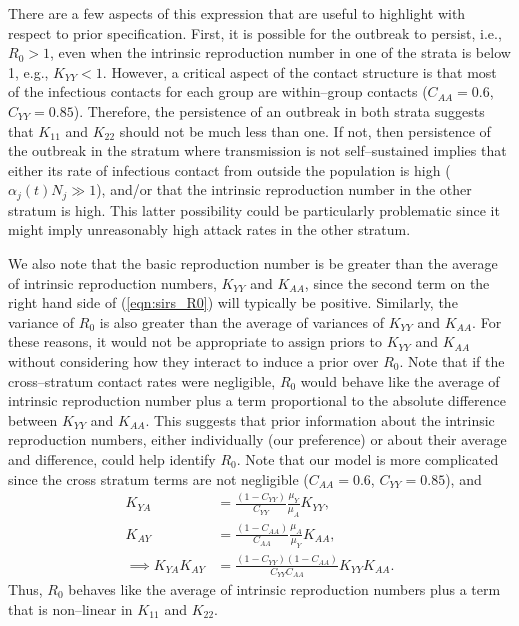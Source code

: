 There are a few aspects of this expression that are useful to highlight with respect to prior specification. First, it is possible for the outbreak to persist, i.e., $ R_0 > 1 $, even when the intrinsic reproduction number in one of the strata is below 1, e.g., $ K_{YY} <1$. However, a critical aspect of the contact structure is that most of the infectious contacts for each group are within--group contacts ($ C_{AA} = 0.6 $, $ C_{YY}=0.85 $). Therefore, the persistence of an outbreak in both strata suggests that $ K_{11} $ and $ K_{22} $ should not be much less than one. If not, then persistence of the outbreak in the stratum where transmission is not self--sustained implies that either its rate of infectious contact from outside the population is high ($ \alpha_j(t)N_j \gg  1$), and/or that the intrinsic reproduction number in the other stratum is high. This latter possibility could be particularly problematic since it might imply unreasonably high attack rates in the other stratum.

We also note that the basic reproduction number is be greater than the average of intrinsic reproduction numbers, $ K_{YY} $ and $ K_{AA} $, since the second term on the right hand side of (\ref{eqn:sirs_R0}) will typically be positive. Similarly, the variance of $ R_0 $ is also greater than the average of variances of $ K_{YY} $ and $ K_{AA} $. For these reasons, it would not be appropriate to assign priors to $ K_{YY} $ and $ K_{AA} $ without considering how they interact to induce a prior over $ R_0 $. Note that if the cross--stratum contact rates were negligible, $ R_0 $ would behave like the average of intrinsic reproduction number plus a term proportional to the absolute difference between $ K_{YY} $ and $ K_{AA} $. This suggests that prior information about the intrinsic reproduction numbers, either individually (our preference) or about their average and difference, could help identify $ R_0 $. Note that our model is more complicated since the cross stratum terms are not negligible ($ C_{AA} = 0.6 $, $ C_{YY}=0.85 $), and 
\begin{align*}
K_{YA} &= \frac{(1 - C_{YY})}{C_{YY}}\frac{\mu_Y}{\mu_A}K_{YY},\\
K_{AY} &= \frac{(1 - C_{AA})}{C_{AA}}\frac{\mu_A}{\mu_Y}K_{AA},\\
\implies K_{YA}K_{AY} &= \frac{(1 - C_{YY})(1-C_{AA})}{C_{YY}C_{AA}}K_{YY}K_{AA}.
\end{align*} 
Thus, $ R_0 $ behaves like the average of intrinsic reproduction numbers plus a term that is non--linear in $ K_{11} $ and $ K_{22} $.

